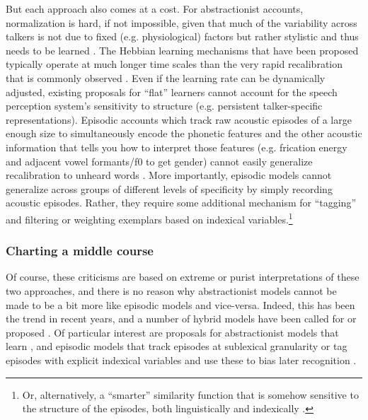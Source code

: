 But each approach also comes at a cost. For abstractionist accounts, normalization is hard, if not impossible, given that much of the variability across talkers is not due to fixed (e.g. physiological) factors but rather stylistic and thus needs to be learned \autocite{Johnson2006,Pardo2006}.  The Hebbian learning mechanisms that have been proposed typically operate at much longer time scales than the very rapid recalibration that is commonly observed \autocite{Guediche2014,Mirman2006}.  Even if the learning rate can be dynamically adjusted, existing proposals for ``flat'' learners cannot account for the speech perception system's sensitivity to structure (e.g. persistent talker-specific representations).  Episodic accounts which track raw acoustic episodes of a large enough size to simultaneously encode the phonetic features and the other acoustic information that tells you how to interpret those features (e.g. frication energy and adjacent vowel formants/f0 to get gender) cannot easily generalize recalibration to unheard words \autocite{Cutler2010}. More importantly, episodic models cannot generalize across groups of different levels of specificity by simply recording acoustic episodes.  Rather, they require some additional mechanism for ``tagging'' and filtering or weighting exemplars based on indexical variables.\footnote{Or, alternatively, a ``smarter'' similarity function that is somehow sensitive to the structure of the episodes, both linguistically and indexically \autocite[e.g., as discussed above,][]{VandenBosch2013}.}

\subsubsection{Charting a middle course}
\label{sec:chart-middle-course}
\label{r3-abs-epi-converge}

Of course, these criticisms are based on extreme or purist interpretations of these two approaches, and there is no reason why abstractionist models cannot be made to be a bit more like episodic models and vice-versa.  Indeed, this has been the trend in recent years, and a number of hybrid models have been called for or proposed \autocite[e.g.,][]{Ernestus2014,Goldinger2007,McLennan2003}.  Of particular interest are proposals for abstractionist models that learn \autocite{Lancia2013,Mirman2006}, and episodic models that track episodes at sublexical granularity \autocite{Pierrehumbert2006} or tag episodes with explicit indexical variables and use these to bias later recognition \autocite{Johnson2006,Johnson2013}. 

